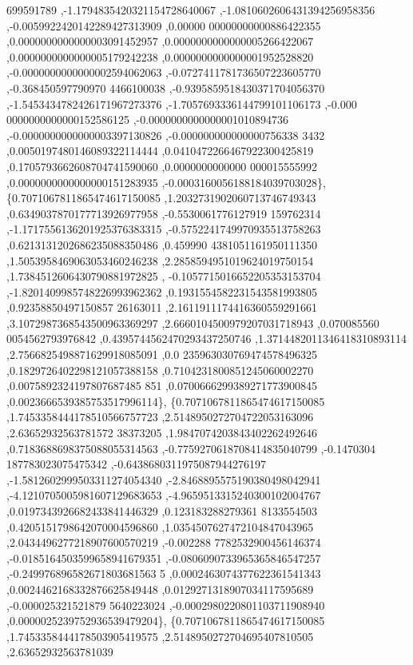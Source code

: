 \begin{DoxyCode}
      699591789 ,-1.1794835420321154728640067 ,-1.0810602606431394256958356 ,-0.0059922420142289427313909 ,0.00000
      00000000000886422355 ,0.0000000000000003091452957 ,0.0000000000000005266422067 ,0.0000000000000005179242238 
      ,0.0000000000000001952528820 ,-0.0000000000000002594062063 ,-0.0727411781736507223605770 ,-0.368450597790970
      4466100038 ,-0.9395859518430371704056370 ,-1.5453434782426171967273376 ,-1.7057693336144799101106173 ,-0.000
      0000000000000152586125 ,-0.0000000000000001010894736 ,-0.0000000000000003397130826 ,-0.000000000000000756338
      3432 ,0.0050197480146089322114444 ,0.0410472266467922300425819 ,0.1705793662608704741590060 ,0.0000000000000
      000015555992 ,0.0000000000000000151283935 ,-0.0003160056188184039703028\},
\{0.7071067811865474617150085 ,1.2032731902060713746749343 ,0.6349037870177713926977958 ,-0.5530061776127919
      159762314 ,-1.1717556136201925376383315 ,-0.5752241749970935513758263 ,0.6213131202686235088350486 ,0.459990
      4381051161950111350 ,1.5053958469063053460246238 ,2.2858594951019624019750154 ,1.7384512606430790881972825 ,
      -0.1057715016652205353153704 ,-1.8201409985748226993962362 ,0.1931554582231543581993805 ,0.92358850497150857
      26163011 ,2.1611911174416360559291661 ,3.1072987368543500963369297 ,2.6660104500979207031718943 ,0.070085560
      0054562793976842 ,0.4395744562470293437250746 ,1.3714482011346418310893114 ,2.7566825498871629918085091 ,0.0
      235963030769474578496325 ,0.1829726402298121057388158 ,0.7104231800851245060002270 ,0.0075892324197807687485
      851 ,0.0700666299389271773900845 ,0.0023666539385753517996114\},
\{0.7071067811865474617150085 ,1.7453358444178510566757723 ,2.5148950272704722053163096 ,2.63652932563781572
      38373205 ,1.9847074203843402262492646 ,0.7183688698375088055314563 ,-0.7759270618708414835040799 ,-0.1470304
      187783023075475342 ,-0.6438680311975087944276197 ,-1.5812602999503311274054340 ,-2.8468895575190380498042941
       ,-4.1210705005981607129683653 ,-4.9659513315240300102004767 ,0.0197343926682433841446329 ,0.123183288279361
      8133554503 ,0.4205151798642070004596860 ,1.0354507627472104847043965 ,2.0434496277218907600570219 ,-0.002288
      7782532900456146374 ,-0.0185164503599658941679351 ,-0.0806090733965365846547257 ,-0.249976896582671803681563
      5 ,0.0002463074377622361541343 ,0.0024462168332876625849448 ,0.0129271318907034117595689 ,-0.000025321521879
      5640223024 ,-0.0002980220801103711908940 ,0.0000025239752936539479204\},
\{0.7071067811865474617150085 ,1.7453358444178503905419575 ,2.5148950272704695407810505 ,2.63652932563781039

\end{DoxyCode}
